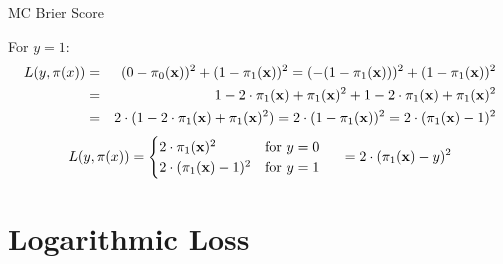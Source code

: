 \documentclass[11pt,compress,t,notes=noshow, xcolor=table]{beamer}
\begin{document}
\begin{vbframe}{MC Brier Score}
\begin{footnotesize}
    For $y = 1$:
  \begin{eqnarray*}
  L(y, \pi(x)) &=& (0-\pi_0(\mathbf{x}))^2 + (1-\pi_1(\mathbf{x}))^2 = (-(1 - \pi_1(\mathbf{x})))^2 + (1-\pi_1(\mathbf{x}))^2 \\
  &=& 1 - 2\cdot\pi_1(\mathbf{x})+ \pi_1(\mathbf{x})^2 + 1 - 2\cdot\pi_1(\mathbf{x})+ \pi_1(\mathbf{x})^2 \\
  &=& 2 \cdot (1 - 2\cdot\pi_1(\mathbf{x})+ \pi_1(\mathbf{x})^2) = 2 \cdot (1 - \pi_1(\mathbf{x}))^2 = 2 \cdot (\pi_1(\mathbf{x}) - 1)^2
  \end{eqnarray*}
  $$L(y, \pi(x)) = \begin{cases}
  2 \cdot \pi_1(\mathbf{x})^2 & \text{for } y = 0 \\
  2 \cdot (\pi_1(\mathbf{x}) - 1)^2 & \text{for } y = 1\\
  \end{cases}
    \hspace{0.5cm} = 2 \cdot (\pi_1(\mathbf{x}) - y)^2 $$
  \end{footnotesize}
\end{vbframe}

\section{Logarithmic Loss}
\end{document}
